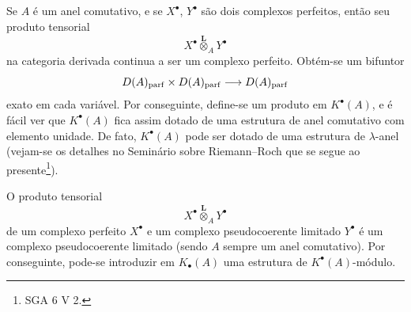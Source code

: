Se $A$ é um anel comutativo, e se $X^\bullet$, $Y^\bullet$ são dois complexos perfeitos, então seu produto tensorial
\[
X^\bullet\overset{\mathbf L}{\otimes}_A Y^\bullet
\]
na categoria derivada continua a ser um complexo perfeito. Obtém-se um bifuntor
\[
D(A)_{\mathrm{parf}}\times D(A)_{\mathrm{parf}}\longrightarrow D(A)_{\mathrm{parf}}
\]
exato em cada variável. Por conseguinte, define-se um produto em $K^{\bullet}(A)$, e é fácil ver que $K^{\bullet}(A)$ fica assim dotado de uma estrutura de anel comutativo com elemento unidade. De fato, $K^{\bullet}(A)$ pode ser dotado de uma estrutura de $\lambda$-anel (vejam-se os detalhes no Seminário sobre Riemann--Roch que se segue ao presente\footnote{SGA 6 V 2.}).

O produto tensorial
\[
X^\bullet\overset{\mathbf L}{\otimes}_A Y^\bullet
\]
de um complexo perfeito $X^\bullet$ e um complexo pseudocoerente limitado $Y^\bullet$ é um complexo pseudocoerente limitado (sendo $A$ sempre um anel comutativo). Por conseguinte, pode-se introduzir em $K_\bullet(A)$ uma estrutura de $K^{\bullet}(A)$-módulo.
